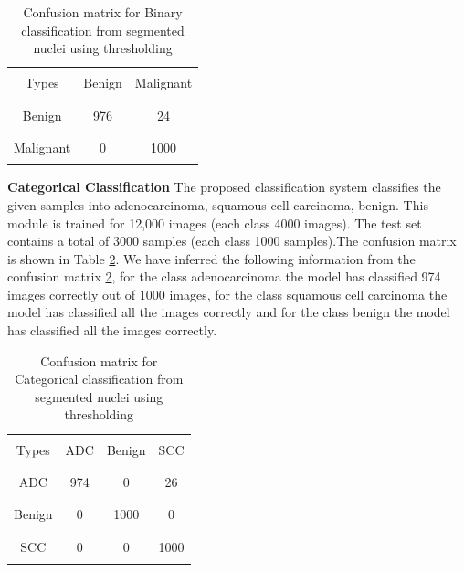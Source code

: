 \documentclass[conference]{IEEEtran}
\begin{document}
\begin{table}
\begin{center}
\begin{tabular}[scale=2.0]{ | c |c  |c  | }
  \hline    
  &  &\\
  Types  & Benign & Malignant  \\
  & & \\
   \hline
   &  & \\
  Benign & 976  &  24   \\ 
  & & \\
  \hline
  &  & \\
  Malignant  & 0 &    1000   \\
  & & \\
  \hline  
\end{tabular}
\caption{Confusion matrix for Binary classification from segmented nuclei using thresholding}
\label{table3}
\end{center}
\end{table}
\newpage


\newpage
%
\newpage
\textbf{Categorical Classification}\newline
The proposed classification system classifies the given samples into adenocarcinoma, squamous cell carcinoma, benign. This module is trained for 12,000 images (each class 4000 images). The test set contains a total of 3000 samples (each class 1000 samples).The confusion matrix is shown in Table \ref{table4}. We have inferred the following information from the confusion matrix \ref{table4}, for the class adenocarcinoma the model has classified 974 images correctly out of 1000 images, for the class squamous cell carcinoma the model has classified all the images correctly and for the class benign the model has classified all the images correctly.

\begin{table}
\begin{center}
\begin{tabular}[scale=1.4]{ | c | c | c | c | }
  \hline        
   &  & &\\
   Types & ADC & Benign & SCC  \\
    &  & &\\
   \hline        
   &  & &\\
   ADC & 974  & 0 & 26 \\
   & & &\\
   \hline
   & & &\\
   Benign & 0 & 1000 & 0 \\
   & & &\\
   \hline
   & & &\\
   SCC & 0 & 0 & 1000 \\
   &  & &\\
  
  \hline  
\end{tabular}
\caption{Confusion matrix for Categorical classification from segmented nuclei using thresholding }
\label{table4}
\end{center}
\end{table}
\end{document}
